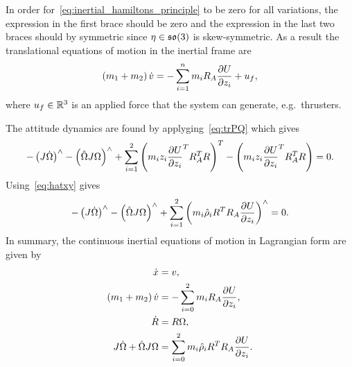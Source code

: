 In order for~\cref{eq:inertial_hamiltons_principle} to be zero for all variations, the expression in the first brace should be zero and the expression in the last two braces should by symmetric since \( \eta \in \mathfrak{so}(3) \) is skew-symmetric.
As a result the translational equations of motion in the inertial frame are
\begin{align*}
    \left( m_1 + m_2 \right) \dot{v} = - \sum_{i=1}^n m_i R_A \frac{\partial U}{\partial z_i} + u_f,
\end{align*}
where \( u_f \in \mathbb{R}^3 \) is an applied force that the system can generate, e.g.\ thrusters.

The attitude dynamics are found by applyging~\cref{eq:trPQ} which gives
\begin{align}
    -\left( J \dot{\Omega} \right)^\wedge - \left(  \hat{\Omega} J \Omega \right)^\wedge + \sum_{i=1}^{2} \left( m_i z_i \frac{\partial U}{\partial z_i}^T R_A^T R  \right)^T - \left( m_i z_i \frac{\partial U}{\partial z_i}^T R_A^T R   \right) = 0.
\end{align}
Using~\cref{eq:hatxy} gives
\begin{align}
    -\left( J \dot{\Omega} \right)^\wedge - \left(  \hat{\Omega} J \Omega \right)^\wedge + \sum_{i=1}^2 \left( m_i \hat{\rho}_i R^T R_A \frac{\partial U}{\partial z_i} \right)^\wedge  = 0.
\end{align}
In summary, the continuous inertial equations of motion in Lagrangian form are given by
\begin{align}
    \dot{x} &= v, \\
    \left( m_1 + m_2 \right) \dot{v} &= - \sum_{i=0}^2 m_i R_A \frac{\partial U}{\partial z_i}, \\
    \dot{R} &= R \Omega, \\
    J \dot{\Omega} + \hat{\Omega} J \Omega &= \sum_{i=0}^2 m_i \hat{\rho}_i R^T R_A \frac{\partial U}{\partial z_i} .
\end{align}

